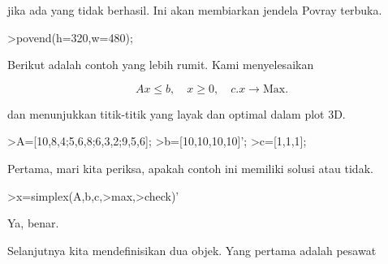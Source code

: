 \documentclass[12pt,arial,letterpaper]{book}
\begin{document}
\begin{eulernootebook}
\begin{eulercomment}
\begin{eulercomment}
\begin{eulernootebook}
\begin{eulercomment}
\begin{eulercomment}
\begin{eulercomment}
\begin{eulercomment}
\begin{eulercomment}
\begin{eulercomment}
\begin{eulercomment}
\begin{eulernotebook}
\begin{eulercomment}
jika ada yang tidak berhasil. Ini akan membiarkan jendela Povray
terbuka.
\end{eulercomment}
\begin{eulerprompt}
>povend(h=320,w=480);
\end{eulerprompt}
\begin{eulercomment}
Berikut adalah contoh yang lebih rumit. Kami menyelesaikan

\end{eulercomment}
\begin{eulerformula}
\[
Ax \le b, \quad x \ge 0, \quad c.x \to \text{Max.}
\]
\end{eulerformula}
\begin{eulercomment}
dan menunjukkan titik-titik yang layak dan optimal dalam plot 3D.
\end{eulercomment}
\begin{eulerprompt}
>A=[10,8,4;5,6,8;6,3,2;9,5,6];
>b=[10,10,10,10]';
>c=[1,1,1];
\end{eulerprompt}
\begin{eulercomment}
Pertama, mari kita periksa, apakah contoh ini memiliki solusi atau
tidak.
\end{eulercomment}
\begin{eulerprompt}
>x=simplex(A,b,c,>max,>check)'
\end{eulerprompt}
\begin{euleroutput}
  [0,  1,  0.5]
\end{euleroutput}
\begin{eulercomment}
Ya, benar.

Selanjutnya kita mendefinisikan dua objek. Yang pertama adalah pesawat


\end{eulercomment}
\end{eulernotebook}
\end{eulercomment}
\end{eulercomment}
\end{eulercomment}
\end{eulercomment}
\end{eulercomment}
\end{eulercomment}
\end{eulercomment}
\end{eulernootebook}
\end{eulercomment}
\end{eulercomment}
\end{eulernootebook}
\end{document}
